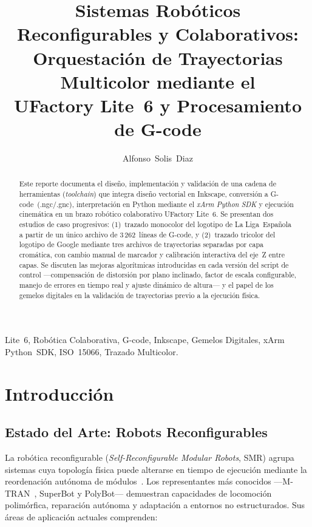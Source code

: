 \documentclass[journal,compsoc]{IEEEtran}
\title{Sistemas Robóticos Reconfigurables y Colaborativos:\\
Orquestación de Trayectorias Multicolor mediante el\\
UFactory Lite~6 y Procesamiento de G-code}
\author{Alfonso~Solis~Diaz\\
\IEEEauthorblockA{%
Departamento de Ingeniería Robótica y Sistemas\\
Tecnológico de Monterrey\\
\texttt{a01735928@tec.mx}}
}
\begin{document}
\maketitle

\begin{abstract}
Este reporte documenta el diseño, implementación y validación de una cadena de herramientas (\textit{toolchain}) que integra diseño vectorial en Inkscape, conversión a G-code~(.ngc/.gnc), interpretación en Python mediante el \textit{xArm Python SDK} y ejecución cinemática en un brazo robótico colaborativo UFactory Lite~6. Se presentan dos estudios de caso progresivos: (1)~trazado monocolor del logotipo de La Liga~Española a partir de un único archivo de 3\,262~líneas de G-code, y (2)~trazado tricolor del logotipo de Google mediante tres archivos de trayectorias separadas por capa cromática, con cambio manual de marcador y calibración interactiva del eje~Z entre capas. Se discuten las mejoras algorítmicas introducidas en cada versión del script de control ---compensación de distorsión por plano inclinado, factor de escala configurable, manejo de errores en tiempo real y ajuste dinámico de altura--- y el papel de los gemelos digitales en la validación de trayectorias previo a la ejecución física.
\end{abstract}

\begin{IEEEkeywords}
Lite~6, Robótica Colaborativa, G-code, Inkscape, Gemelos Digitales, xArm Python~SDK, ISO~15066, Trazado Multicolor.
\end{IEEEkeywords}

\section{Introducción}

\subsection{Estado del Arte: Robots Reconfigurables}

La robótica reconfigurable (\textit{Self-Reconfigurable Modular Robots}, SMR) agrupa sistemas cuya topología física puede alterarse en tiempo de ejecución mediante la reordenación autónoma de módulos~\cite{murata_smr}. Los representantes más conocidos ---M-TRAN~\cite{murata_smr}, SuperBot y PolyBot--- demuestran capacidades de locomoción polimórfica, reparación autónoma y adaptación a entornos no estructurados. Sus áreas de aplicación actuales comprenden:
\end{document}

